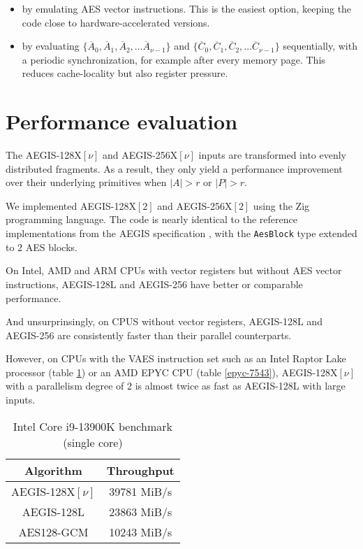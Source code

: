 \documentclass[envcountsame,runningheads,notitlepage]{llncs}
\begin{document}
\begin{itemize}
  \item by emulating AES vector instructions. This is the easiest option, keeping the code close to hardware-accelerated versions.
  \item by evaluating $\{ \overline{A}_0, \overline{A}_1, \overline{A}_2, \ldots \overline{A}_{\nu-1} \}$ and $\{ \overline{C}_0, \overline{C}_1, \overline{C}_2, \ldots \overline{C}_{\nu-1} \}$ sequentially, with a periodic synchronization, for example after every memory page. This reduces cache-locality but also register pressure.
\end{itemize}

\section{Performance evaluation}
\label{sec:performance evaluation}

The AEGIS-128X$[\nu]$ and AEGIS-256X$[\nu]$ inputs are transformed into evenly distributed fragments.
As a result, they only yield a performance improvement over their underlying primitives when $\lvert A \rvert > r$ or $\lvert P \rvert > r$.

We implemented AEGIS-128X$[2]$ and AEGIS-256X$[2]$ using the Zig programming language. The code is nearly identical to the reference implementations from the AEGIS specification \cite{DSL2023}, with the \lstinline{AesBlock} type extended to 2 AES blocks.

On Intel, AMD and ARM CPUs with vector registers but without AES vector instructions, AEGIS-128L and AEGIS-256 have better or comparable performance.

And unsurprinsingly, on CPUS without vector registers, AEGIS-128L and AEGIS-256 are consistently faster than their parallel counterparts.

However, on CPUs with the VAES instruction set such as an Intel Raptor Lake processor (table \ref{i9-13900K}) or an AMD EPYC CPU (table \ref{epyc-7543}), AEGIS-128X$[\nu]$ with a parallelism degree of $2$ is almost twice as fast as AEGIS-128L with large inputs.

\begin{table}
  \begin{center}
    \begin{tabular}{|c|c|}
      \hline
      Algorithm         & Throughput  \\
      \hline
      AEGIS-128X$[\nu]$ & 39781 MiB/s \\
      \hline
      AEGIS-128L        & 23863 MiB/s \\
      \hline
      AES128-GCM        & 10243 MiB/s \\
      \hline
    \end{tabular}
    \caption{\label{i9-13900K}Intel Core i9-13900K benchmark (single core)}
  \end{center}
\end{table}
\end{document}
